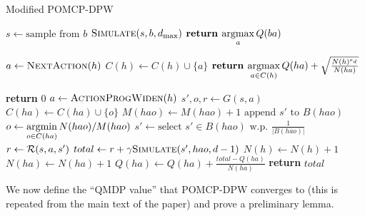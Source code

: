 \begin{algorithm}[htb]
    \caption{Modified POMCP-DPW} \label{alg:mpomcpdpw}
    \begin{algorithmic}[1]
                \State $s \gets \text{sample from }b$ \label{lin:msample}
                \State $\Call{Simulate}{s, b, d_\text{max}}$
            \EndFor
            \State $\textbf{return } \underset{a}{\argmax}\, Q(ba)$
        \EndProcedure

                \State $a \gets \Call{NextAction}{h}$
                \State $C(h) \gets C(h) \cup \{a\}$
            \EndIf
            \State $\textbf{return } \underset{a \in C(h)}{\argmax}\, Q(ha) + \sqrt{\frac{N(h)^{e_d}}{N(ha)}}$
        \EndProcedure

                \State \textbf{return} $0$
            \EndIf
            \State $a \gets \Call{ActionProgWiden}{h}$
                \State $s',o,r \gets G(s,a)$
                \State $C(ha) \gets C(ha) \cup \{o\}$
                \State $M(hao) \gets M(hao) + 1$ \label{lin:gencount}
                \State $\text{append } s' \text{ to } B(hao)$ \label{lin:minsertion}
            \Else
                \State $o \gets \underset{o \in C(ha)}{\argmin}\, N(hao)/M(hao)$
                \State $s' \gets \text{select } s' \in B(hao) \text{ w.p. } \frac{1}{|B(hao)|}$
                \State $r \gets \mathcal{R}(s,a,s')$
            \EndIf
            \State $total \gets r + \gamma \Call{Simulate}{s', hao, d-1}$
            \State $N(h) \gets N(h)+1$
            \State $N(ha) \gets N(ha)+1$
            \State $Q(ha) \gets Q(ha) + \frac{total - Q(ha)}{N(ha)}$
            \State \textbf{return} $total$
        \EndProcedure
    \end{algorithmic}        
\end{algorithm}

We now define the ``QMDP value'' that POMCP-DPW converges to (this is repeated from the main text of the paper) and prove a preliminary lemma.

\qmdpvalue*

